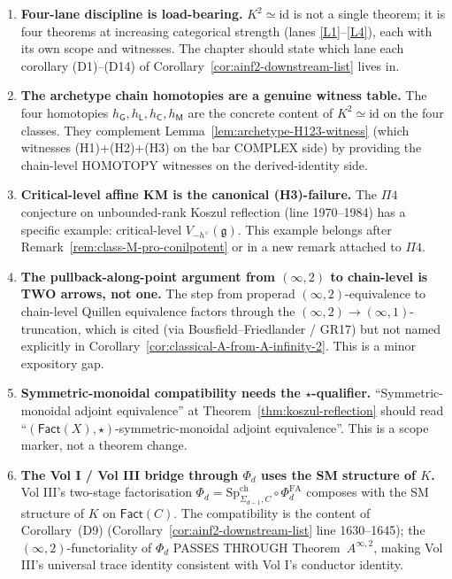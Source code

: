 \documentclass[11pt]{article}
\theoremstyle{definition}
\newcommand{\Fact}{\mathsf{Fact}}
\newcommand{\id}{\mathrm{id}}
\begin{document}
\begin{enumerate}[label=\textbf{(S\arabic*)}]
\item \textbf{Four-lane discipline is load-bearing.}
$K^{2}\simeq\id$ is not a single theorem; it is four theorems at
increasing categorical strength (lanes \ref{L1}--\ref{L4}), each
with its own scope and witnesses. The chapter should state which
lane each corollary (D1)--(D14) of
Corollary~\ref{cor:ainf2-downstream-list} lives in.
\item \textbf{The archetype chain homotopies are a genuine witness
table.} The four homotopies $h_\mathsf{G},h_\mathsf{L},h_\mathsf{C},h_\mathsf{M}$
are the concrete content of $K^{2}\simeq\id$ on the four classes.
They complement Lemma~\ref{lem:archetype-H123-witness} (which
witnesses (H1)+(H2)+(H3) on the bar COMPLEX side) by providing
the chain-level HOMOTOPY witnesses on the derived-identity side.
\item \textbf{Critical-level affine KM is the canonical
(H3)-failure.} The $\Pi 4$ conjecture on unbounded-rank Koszul
reflection (line 1970--1984) has a specific example: critical-level
$V_{-h^\vee}(\mathfrak{g})$. This example belongs after
Remark~\ref{rem:class-M-pro-conilpotent} or in a new remark
attached to $\Pi 4$.
\item \textbf{The pullback-along-point argument from
$(\infty,2)$ to chain-level is TWO arrows, not one.} The step from
properad $(\infty,2)$-equivalence to chain-level Quillen equivalence
factors through the $(\infty,2)\to(\infty,1)$-truncation, which is
cited (via Bousfield--Friedlander / GR17) but not named explicitly
in Corollary~\ref{cor:classical-A-from-A-infinity-2}. This is a
minor expository gap.
\item \textbf{Symmetric-monoidal compatibility needs the
$\star$-qualifier.} ``Symmetric-monoidal adjoint equivalence'' at
Theorem~\ref{thm:koszul-reflection} should read
``$(\Fact(X),\star)$-symmetric-monoidal adjoint equivalence''. This
is a scope marker, not a theorem change.
\item \textbf{The Vol I / Vol III bridge through $\Phi_d$ uses
the SM structure of $K$.} Vol III's two-stage factorisation
$\Phi_d=\mathrm{Sp}^{\mathrm{ch}}_{\Sigma_{d-1},C}\circ\Phi^{\mathrm{FA}}_d$
composes with the SM structure of $K$ on $\Fact(C)$. The
compatibility is the content of Corollary~(D9)
(Corollary~\ref{cor:ainf2-downstream-list} line 1630--1645); the
$(\infty,2)$-functoriality of $\Phi_d$ PASSES THROUGH
Theorem~$A^{\infty,2}$, making Vol III's universal trace identity
consistent with Vol I's conductor identity.
\end{enumerate}
\end{document}
